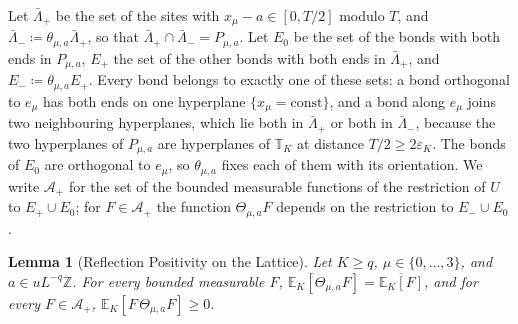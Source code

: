 \documentclass[11pt]{preprint}
\numberwithin{equation}{section}
\newtheorem{lemma}[theorem]{Lemma}
\theoremstyle{definition}
\theoremstyle{remark}
\theoremstyle{plain}
\begin{document}
Let $\bar\Lambda_+$ be the set of the sites with $x_\mu - a \in [0, T/2]$ modulo $T$, and $\bar\Lambda_- \coloneqq \theta_{\mu,a}\bar\Lambda_+$, so that $\bar\Lambda_+ \cap \bar\Lambda_- = P_{\mu,a}$. Let $E_0$ be the set of the bonds with both ends in $P_{\mu,a}$, $E_+$ the set of the other bonds with both ends in $\bar\Lambda_+$, and $E_- \coloneqq \theta_{\mu,a}E_+$. Every bond belongs to exactly one of these sets: a bond orthogonal to $e_\mu$ has both ends on one hyperplane $\{ x_\mu = \mathrm{const} \}$, and a bond along $e_\mu$ joins two neighbouring hyperplanes, which lie both in $\bar\Lambda_+$ or both in $\bar\Lambda_-$, because the two hyperplanes of $P_{\mu,a}$ are hyperplanes of $\mathbb T_K$ at distance $T/2 \geq 2\varepsilon_K$. The bonds of $E_0$ are orthogonal to $e_\mu$, so $\theta_{\mu,a}$ fixes each of them with its orientation. We write $\mathcal A_+$ for the set of the bounded measurable functions of the restriction of $U$ to $E_+ \cup E_0$; for $F \in \mathcal A_+$ the function $\Theta_{\mu,a}F$ depends on the restriction to $E_- \cup E_0$.

\begin{lemma}[Reflection Positivity on the Lattice]\label{lem:lattice-reflection-positivity}
Let $K \geq q$, $\mu \in \{ 0, \dots, 3 \}$, and $a \in uL^{-q}\mathbb Z$. For every bounded measurable $F$, $\mathbb E_K[\Theta_{\mu,a}F] = \overline{\mathbb E_K[F]}$, and for every $F \in \mathcal A_+$, $\mathbb E_K[F\,\Theta_{\mu,a}F] \geq 0$.
\end{lemma}
\end{document}
